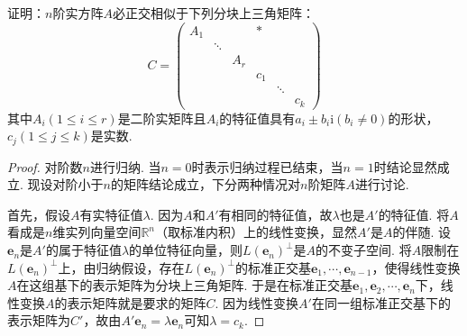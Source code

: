 \documentclass[../../main.tex]{subfiles}
\begin{document}
\begin{proposition}\label{proposition:例9.87}
证明：\(n\)阶实方阵\(A\)必正交相似于下列分块上三角矩阵：
\[
C = 
\begin{pmatrix}
A_1 & & & * \\
& \ddots & & \\
& & A_r & \\
& & & c_1 & \\
& & & & \ddots & \\
& & & & & c_k
\end{pmatrix}
\]
其中\(A_i(1\leq i\leq r)\)是二阶实矩阵且\(A_i\)的特征值具有\(a_i\pm b_i\mathrm{i}(b_i\neq0)\)的形状，\(c_j(1\leq j\leq k)\)是实数.
\end{proposition}
\begin{proof}
对阶数\(n\)进行归纳. 当\(n = 0\)时表示归纳过程已结束，当\(n = 1\)时结论显然成立. 现设对阶小于\(n\)的矩阵结论成立，下分两种情况对\(n\)阶矩阵\(A\)进行讨论.

首先，假设\(A\)有实特征值\(\lambda\). 因为\(A\)和\(A'\)有相同的特征值，故\(\lambda\)也是\(A'\)的特征值. 将\(A\)看成是\(n\)维实列向量空间\(\mathbb{R}^n\)（取标准内积）上的线性变换，显然\(A'\)是\(A\)的伴随. 设\(\boldsymbol{e}_n\)是\(A'\)的属于特征值\(\lambda\)的单位特征向量，则\(L(\boldsymbol{e}_n)^\perp\)是\(A\)的不变子空间. 将\(A\)限制在\(L(\boldsymbol{e}_n)^\perp\)上，由归纳假设，存在\(L(\boldsymbol{e}_n)^\perp\)的标准正交基\(\boldsymbol{e}_1,\cdots,\boldsymbol{e}_{n - 1}\)，使得线性变换\(A\)在这组基下的表示矩阵为分块上三角矩阵. 于是在标准正交基\(\boldsymbol{e}_1,\boldsymbol{e}_2,\cdots,\boldsymbol{e}_n\)下，线性变换\(A\)的表示矩阵就是要求的矩阵\(C\). 因为线性变换\(A'\)在同一组标准正交基下的表示矩阵为\(C'\)，故由\(A'\boldsymbol{e}_n=\lambda\boldsymbol{e}_n\)可知\(\lambda = c_k\).


\end{proof}
\end{document}
